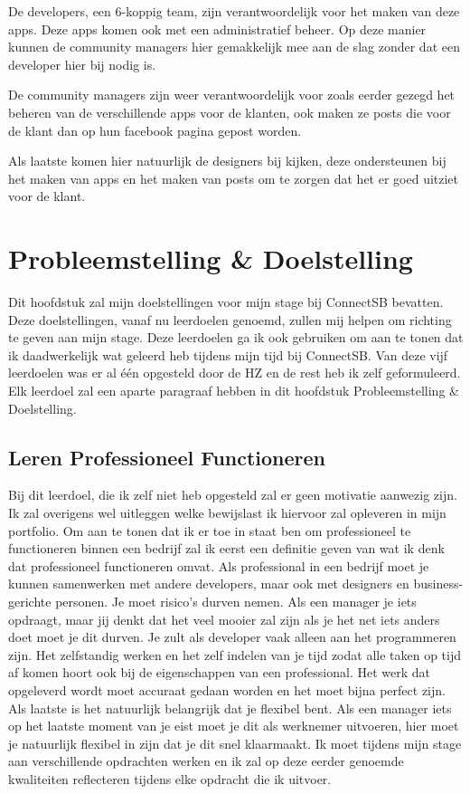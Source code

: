 \documentclass{article}
\begin{document}
De developers, een 6-koppig team, zijn verantwoordelijk voor het maken van deze apps. Deze apps komen ook met een administratief beheer. Op deze manier kunnen de community managers hier gemakkelijk mee aan de slag zonder dat een developer hier bij nodig is. 

De community managers zijn weer verantwoordelijk voor zoals eerder gezegd het beheren van de verschillende apps voor de klanten, ook maken ze posts die voor de klant dan op hun facebook pagina gepost worden.

Als laatste komen hier natuurlijk de designers bij kijken, deze ondersteunen bij het maken van apps en het maken van posts om te zorgen dat het er goed uitziet voor de klant.

\clearpage



\section{Probleemstelling \& Doelstelling}
Dit hoofdstuk zal mijn doelstellingen voor mijn stage bij ConnectSB bevatten. Deze doelstellingen, vanaf nu leerdoelen genoemd, zullen mij helpen om richting te geven aan mijn stage. Deze leerdoelen ga ik ook gebruiken om aan te tonen dat ik daadwerkelijk wat geleerd heb tijdens mijn tijd bij ConnectSB. Van deze vijf leerdoelen was er al één opgesteld door de HZ en de rest heb ik zelf geformuleerd.
Elk leerdoel zal een aparte paragraaf hebben in dit hoofdstuk Probleemstelling \& Doelstelling.

\subsection{Leren Professioneel Functioneren}
Bij dit leerdoel, die ik zelf niet heb opgesteld zal er geen motivatie aanwezig zijn. Ik zal overigens wel uitleggen welke bewijslast ik hiervoor zal opleveren in mijn portfolio. 
Om aan te tonen dat ik er toe in staat ben om professioneel te functioneren binnen een bedrijf zal ik eerst een definitie geven van wat ik denk dat professioneel functioneren omvat. Als professional in een bedrijf moet je kunnen samenwerken met andere developers, maar ook met designers en business-gerichte personen. Je moet risico's durven nemen. Als een manager je iets opdraagt, maar jij denkt dat het veel mooier zal zijn als je het net iets anders doet moet je dit durven. Je zult als developer vaak alleen aan het programmeren zijn. Het zelfstandig werken en het zelf indelen van je tijd zodat alle taken op tijd af komen hoort ook bij de eigenschappen van een professional. Het werk dat opgeleverd wordt moet accuraat gedaan worden en het moet bijna perfect zijn. 
Als laatste is het natuurlijk belangrijk dat je flexibel bent. Als een manager iets op het laatste moment van je eist moet je dit als werknemer uitvoeren, hier moet je natuurlijk flexibel in zijn dat je dit snel klaarmaakt.
Ik moet tijdens mijn stage aan verschillende opdrachten werken en ik zal op deze eerder genoemde kwaliteiten reflecteren tijdens elke opdracht die ik uitvoer.
\end{document}
